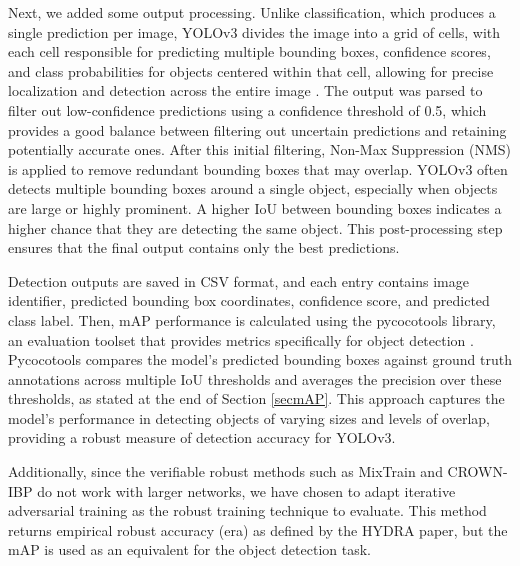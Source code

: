 \documentclass[journal,onecolumn,12pt]{IEEEtran}
\begin{document}
Next, we added some output processing. Unlike classification, which produces a single prediction per image, YOLOv3 divides the image into a grid of cells, with each cell responsible for predicting multiple bounding boxes, confidence scores, and class probabilities for objects centered within that cell, allowing for precise localization and detection across the entire image \cite{redmon2018yolov3incrementalimprovement}. The output was parsed to filter out low-confidence predictions using a confidence threshold of 0.5, which provides a good balance between filtering out uncertain predictions and retaining potentially accurate ones. After this initial filtering, Non-Max Suppression (NMS) \cite{nms} is applied to remove redundant bounding boxes that may overlap. YOLOv3 often detects multiple bounding boxes around a single object, especially when objects are large or highly prominent. A higher IoU between bounding boxes indicates a higher chance that they are detecting the same object. This post-processing step ensures that the final output contains only the best predictions.

Detection outputs are saved in CSV format, and each entry contains image identifier, predicted bounding box coordinates, confidence score, and predicted class label. Then, mAP performance is calculated using the pycocotools library, an evaluation toolset that provides metrics specifically for object detection \cite{lin2015microsoft}. Pycocotools compares the model’s predicted bounding boxes against ground truth annotations across multiple IoU thresholds and averages the precision over these thresholds, as stated at the end of Section \ref{secmAP}. This approach captures the model’s performance in detecting objects of varying sizes and levels of overlap, providing a robust measure of detection accuracy for YOLOv3.

Additionally, since the verifiable robust methods such as MixTrain and CROWN-IBP do not work with larger networks, we have chosen to adapt iterative adversarial training as the robust training technique to evaluate. This method returns empirical robust accuracy (era) as defined by the HYDRA paper, but the mAP is used as an equivalent for the object detection task.
\end{document}
